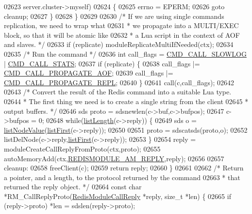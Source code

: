 \begin{DoxyCode}
{{{02623                            server.cluster->myself)
02624         \{
02625             errno = EPERM;
02626             \textcolor{keywordflow}{goto} cleanup;
02627         \}
02628     \}
02629 
02630     \textcolor{comment}{/* If we are using single commands replication, we need to wrap what}
02631 \textcolor{comment}{     * we propagate into a MULTI/EXEC block, so that it will be atomic like}
02632 \textcolor{comment}{     * a Lua script in the context of AOF and slaves. */}
02633     \textcolor{keywordflow}{if} (replicate) moduleReplicateMultiIfNeeded(ctx);
02634 
02635     \textcolor{comment}{/* Run the command */}
02636     \textcolor{keywordtype}{int} call\_flags = \hyperlink{server_8h_a934cea7b13db05a29264146cd5b14064}{CMD\_CALL\_SLOWLOG} | \hyperlink{server_8h_a7b1d9cf5be21e4808da0c16f03155973}{CMD\_CALL\_STATS};
02637     \textcolor{keywordflow}{if} (replicate) \{
02638         call\_flags |= \hyperlink{server_8h_a3ca848c94df18641ac372c58fca0e236}{CMD\_CALL\_PROPAGATE\_AOF};
02639         call\_flags |= \hyperlink{server_8h_a69e4a8fdb26588e1028deb20fd51424a}{CMD\_CALL\_PROPAGATE\_REPL};
02640     \}
02641     call(c,call\_flags);
02642 
02643     \textcolor{comment}{/* Convert the result of the Redis command into a suitable Lua type.}
02644 \textcolor{comment}{     * The first thing we need is to create a single string from the client}
02645 \textcolor{comment}{     * output buffers. */}
02646     sds proto = sdsnewlen(c->buf,c->bufpos);
02647     c->bufpos = 0;
02648     \textcolor{keywordflow}{while}(\hyperlink{adlist_8h_afde0ab079f934670e82119b43120e94b}{listLength}(c->reply)) \{
02649         sds o = \hyperlink{adlist_8h_af84cae230e7180ebcda1e2736fce9f65}{listNodeValue}(\hyperlink{adlist_8h_aa8dc514bbe217bb2e87c1c77cfa84690}{listFirst}(c->reply));
02650 
02651         proto = sdscatsds(proto,o);
02652         listDelNode(c->reply,\hyperlink{adlist_8h_aa8dc514bbe217bb2e87c1c77cfa84690}{listFirst}(c->reply));
02653     \}
02654     reply = moduleCreateCallReplyFromProto(ctx,proto);
02655     autoMemoryAdd(ctx,\hyperlink{module_8c_a3a23ca3942d52889333fbd34f6efcffe}{REDISMODULE\_AM\_REPLY},reply);
02656 
02657 cleanup:
02658     freeClient(c);
02659     \textcolor{keywordflow}{return} reply;
02660 \}
02661 
02662 \textcolor{comment}{/* Return a pointer, and a length, to the protocol returned by the command}
02663 \textcolor{comment}{ * that returned the reply object. */}
02664 \textcolor{keyword}{const} \textcolor{keywordtype}{char} *RM\_CallReplyProto(\hyperlink{structRedisModuleCallReply}{RedisModuleCallReply} *reply, size\_t *len) \{
02665     \textcolor{keywordflow}{if} (reply->proto) *len = sdslen(reply->proto);
}}}
\end{DoxyCode}
